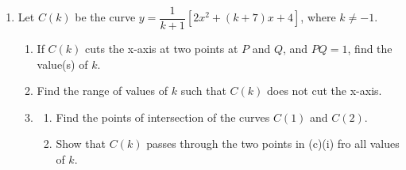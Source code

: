 \documentclass[11pt]{article}
\begin{document}
\begin{enumerate}
        \pagebreak
        \item Let $C(k)$ be the curve $y=\dfrac{1}{k+1}[2x^2+(k+7)x+4]$, where $k\neq -1$.\begin{enumerate}
            \item If $C(k)$ cuts the x-axis at two points at $P$ and $Q$, and $PQ=1$, find the value(s) of $k$.
            \item Find the range of values of $k$ such that $C(k)$ does not cut the x-axis.
            \item \begin{enumerate}
                \item Find the points of intersection of the curves $C(1)$ and $C(2)$.
                \item Show that $C(k)$ passes through the two points in (c)(i) fro all values of $k$. 
            \end{enumerate} 
        \end{enumerate}
        
            \hrulefill
                
            \hrulefill
            
            \hrulefill
            
            \hrulefill
            
            \hrulefill
            
            \hrulefill
            
            \hrulefill
            
            \hrulefill
            
            \hrulefill
            
            \hrulefill
            
            \hrulefill
            
            \hrulefill
            
            \hrulefill
            
            \hrulefill
            
            \hrulefill
            
            \hrulefill
            
            \hrulefill
            
            \hrulefill
            
            \hrulefill
            
            \hrulefill
            
            \hrulefill
            

\end{enumerate}
\end{document}
